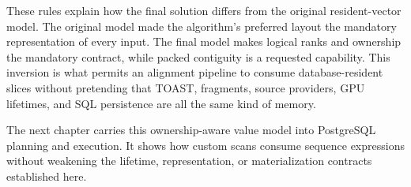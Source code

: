 These rules explain how the final solution differs from the original
resident-vector model.  The original model made the algorithm's preferred
layout the mandatory representation of every input.  The final model makes
logical ranks and ownership the mandatory contract, while packed contiguity is
a requested capability.  This inversion is what permits an alignment pipeline
to consume database-resident slices without pretending that TOAST, fragments,
source providers, GPU lifetimes, and SQL persistence are all the same kind of
memory.

The next chapter carries this ownership-aware value model into PostgreSQL
planning and execution.  It shows how custom scans consume sequence expressions
without weakening the lifetime, representation, or materialization contracts
established here.